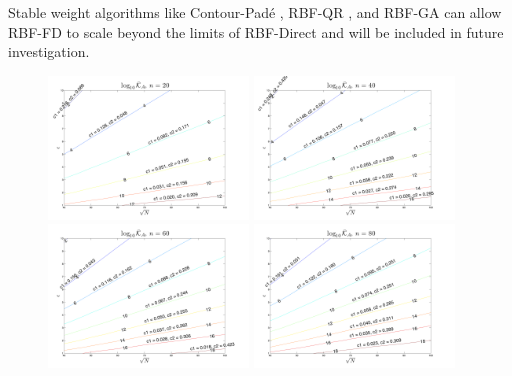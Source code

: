 \documentclass[11pt]{report}
\begin{document}
{%
Stable weight algorithms like Contour-Pad\'{e} \cite{Wright2003}, RBF-QR \cite{Fornberg2007, Fornberg2011a, Davydov2011}, and RBF-GA \cite{Fornberg2012} can allow RBF-FD to scale beyond the limits of RBF-Direct and will be included in future investigation. 


\begin{figure}[htbp]
\centering
\includegraphics[width=0.475\textwidth]{../figures/chapter2/epsilon_contours/labeled_contour_n20.pdf}
\includegraphics[width=0.475\textwidth]{../figures/chapter2/epsilon_contours/labeled_contour_n40.pdf}
\includegraphics[width=0.475\textwidth]{../figures/chapter2/epsilon_contours/labeled_contour_n60.pdf}
\includegraphics[width=0.475\textwidth]{../figures/chapter2/epsilon_contours/labeled_contour_n80.pdf}

\end{figure}}
\end{document}
